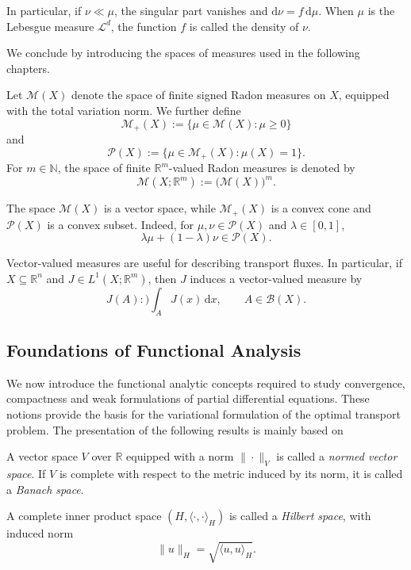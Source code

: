 In particular, if $\nu\ll\mu$, the singular
part vanishes and
$\mathrm{d}\nu=f\,\mathrm{d}\mu$.
When $\mu$ is the Lebesgue measure
$\mathcal{L}^d$, the function $f$ is
called the density of $\nu$.

We conclude by introducing the spaces
of measures used in the following chapters.

\begin{definition}
    Let $\mathcal{M}(X)$ denote the space
    of finite signed Radon measures on $X$,
    equipped with the total variation norm.
    We further define
    \[
        \mathcal{M}_+(X)
        :=\{\mu\in\mathcal{M}(X):
             \mu\geq 0\}
    \]
    and
    \[
        \mathscr{P}(X)
        :=\{\mu\in\mathcal{M}_+(X):
             \mu(X)=1\}.
    \]
    For $m\in\mathbb{N}$, the space of
    finite $\mathbb{R}^m$-valued Radon
    measures is denoted by
    \[
        \mathcal{M}(X;\mathbb{R}^m)
        :=\bigl(\mathcal{M}(X)\bigr)^m.
    \]
\end{definition}

The space $\mathcal{M}(X)$ is a vector
space, while $\mathcal{M}_+(X)$ is a
convex cone and $\mathscr{P}(X)$ is a
convex subset. Indeed, for
$\mu,\nu\in\mathscr{P}(X)$ and
$\lambda\in[0,1]$,
\[
    \lambda\mu+(1-\lambda)\nu
    \in\mathcal{P}(X).
\]

Vector-valued measures are useful for describing transport fluxes. In particular, if $X\subseteq \mathbb{R}^n$ and $J\in L^1(X; \mathbb{R}^m)$, then $J$ induces a vector-valued measure by
$$
J(A):)\int_A J(x)\,\mathrm dx,\qquad A\in\mathcal{B}(X).
$$

\subsection{Foundations of Functional Analysis}

We now introduce the functional analytic concepts required
to study convergence, compactness and weak formulations of
partial differential equations. These notions provide the
basis for the variational formulation of the optimal
transport problem. The presentation of the following results is mainly based on \cite{Alt}


\begin{definition}
    A vector space $V$ over $\mathbb{R}$ equipped with
    a norm $\|\cdot\|_V$ is called a \emph{normed
    vector space}. If $V$ is complete with respect to
    the metric induced by its norm, it is called a
    \emph{Banach space}.

    A complete inner product space $(H,\langle
    \cdot,\cdot\rangle_H)$ is called a
    \emph{Hilbert space}, with induced norm
    \[
        \|u\|_H=\sqrt{\langle u,u\rangle_H}.
    \]
\end{definition}

